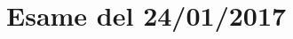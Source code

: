 \documentclass[\main/main.tex]{subfiles}
\begin{document}
\section{Esame del 24/01/2017}

\clearpage

\clearpage

\clearpage

\end{document}
